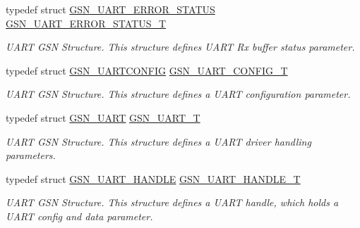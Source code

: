 \begin{DoxyCompactItemize}
typedef struct \hyperlink{a00265}{GSN\_\-UART\_\-ERROR\_\-STATUS} \hyperlink{a00656_ga5129250d6cc2cf041ba60eeb792ea834}{GSN\_\-UART\_\-ERROR\_\-STATUS\_\-T}
\begin{DoxyCompactList}\small\item\em UART GSN Structure. This structure defines UART Rx buffer status parameter. \end{DoxyCompactList}\item 
typedef struct \hyperlink{a00268}{GSN\_\-UARTCONFIG} \hyperlink{a00656_gab793201a4cc37e8cf27b0b640b1f37bc}{GSN\_\-UART\_\-CONFIG\_\-T}
\begin{DoxyCompactList}\small\item\em UART GSN Structure. This structure defines a UART configuration parameter. \end{DoxyCompactList}\item 
typedef struct \hyperlink{a00263}{GSN\_\-UART} \hyperlink{a00656_gacd6ebb3a4883ec781b873a90dbed102a}{GSN\_\-UART\_\-T}
\begin{DoxyCompactList}\small\item\em UART GSN Structure. This structure defines a UART driver handling parameters. \end{DoxyCompactList}\item 
typedef struct \hyperlink{a00266}{GSN\_\-UART\_\-HANDLE} \hyperlink{a00656_ga1e481438503e3525aaef5eb97517e75a}{GSN\_\-UART\_\-HANDLE\_\-T}
\begin{DoxyCompactList}\small\item\em UART GSN Structure. This structure defines a UART handle, which holds a UART config and data parameter. \end{DoxyCompactList}\end{DoxyCompactItemize}
